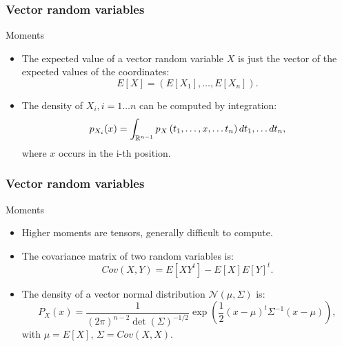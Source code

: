 \begin{frame}
    \frametitle{Vector random variables}
\begin{block}{Moments}
    \begin{itemize}
        \item<+-> The expected value of a vector random variable $X$ is just
        the vector of the expected values of the coordinates:
        \begin{equation}
            E\left[ X \right] = \left( E\left[ X_1 \right], \dots, E\left[ X_n \right] \right).
        \end{equation} 
        \item<+-> The density of $X_i, i=1\dots n$ can be computed by integration:
        \begin{equation}
            p_{X_i}(x) = \int_{\mathbb{R}^{n-1}} p_X\left( t_1, \dots, x, \dots t_n \right) dt_1,\dots dt_n,
        \end{equation}
        where $x$ occurs in the i-th position.
    \end{itemize}
\end{block}
\end{frame}
\begin{frame}
    \frametitle{Vector random variables}
\begin{block}{Moments}
    \begin{itemize}
        \item<+-> Higher moments are tensors, generally difficult to compute.
        \item<+-> The covariance matrix of two random variables is:
        \begin{equation}
            Cov(X,Y) = E\left[ X Y^t \right] - E\left[ X \right]E\left[ Y \right]^t.
        \end{equation}
        \item<+-> The density of a vector normal distribution $\mathcal{N}\left( \mu, \Sigma \right)$ is:
        \begin{equation}
            P_X(x) = \frac{1}{(2\pi)^{n-2}\det(\Sigma)^{-1/2}} 
            \exp \left( \frac{1}{2} (x-\mu)^t \Sigma^{-1} (x-\mu)\right),
        \end{equation}
        with $\mu = E\left[ X \right], \, \Sigma= Cov(X,X).$
        \end{itemize}
\end{block}
\end{frame}
